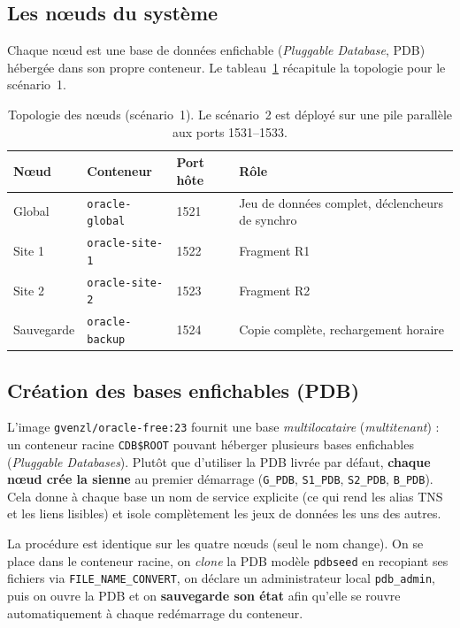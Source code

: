 \documentclass[11pt,a4paper]{article}
\begin{document}
\subsection{Les nœuds du système}

Chaque nœud est une base de données enfichable (\emph{Pluggable Database}, PDB)
hébergée dans son propre conteneur. Le tableau~\ref{tab:noeuds} récapitule la
topologie pour le scénario~1.

\begin{table}[h]
\centering
\begin{tabular}{@{}llll@{}}
\toprule
\textbf{Nœud} & \textbf{Conteneur} & \textbf{Port hôte} & \textbf{Rôle} \\
\midrule
Global    & \texttt{oracle-global} & 1521 & Jeu de données complet, déclencheurs de synchro \\
Site 1    & \texttt{oracle-site-1} & 1522 & Fragment R1 \\
Site 2    & \texttt{oracle-site-2} & 1523 & Fragment R2 \\
Sauvegarde& \texttt{oracle-backup} & 1524 & Copie complète, rechargement horaire \\
\bottomrule
\end{tabular}
\caption{Topologie des nœuds (scénario~1). Le scénario~2 est déployé sur une
pile parallèle aux ports 1531--1533.}
\label{tab:noeuds}
\end{table}

\subsection{Création des bases enfichables (PDB)}
\label{sec:pdb}

L'image \texttt{gvenzl/oracle-free:23} fournit une base \emph{multilocataire}
(\emph{multitenant}) : un conteneur racine \texttt{CDB\$ROOT} pouvant héberger
plusieurs bases enfichables (\emph{Pluggable Databases}). Plutôt que d'utiliser
la PDB livrée par défaut, \textbf{chaque nœud crée la sienne} au premier
démarrage (\texttt{G\_PDB}, \texttt{S1\_PDB}, \texttt{S2\_PDB},
\texttt{B\_PDB}). Cela donne à chaque base un nom de service explicite (ce qui
rend les alias TNS et les liens lisibles) et isole complètement les jeux de
données les uns des autres.

La procédure est identique sur les quatre nœuds (seul le nom change). On se
place dans le conteneur racine, on \emph{clone} la PDB modèle \texttt{pdbseed}
en recopiant ses fichiers via \texttt{FILE\_NAME\_CONVERT}, on déclare un
administrateur local \texttt{pdb\_admin}, puis on ouvre la PDB et on
\textbf{sauvegarde son état} afin qu'elle se rouvre automatiquement à chaque
redémarrage du conteneur.
\end{document}
